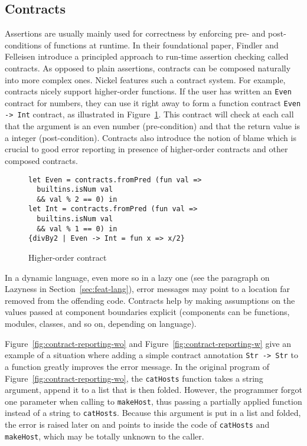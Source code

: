 \documentclass[sigplan,10pt,review,anonymous]{acmart}
\newcommand{\nickel}[1]{\lstinline[language=nickel]{#1}}
\begin{document}
\subsection*{Contracts}

Assertions are usually mainly used for correctness by enforcing pre- and
post-conditions of functions at runtime. In their foundational
paper\cite{FindlerFelleisenHOContracts}, Findler and Felleisen introduce a
principled approach to run-time assertion checking called contracts. As opposed
to plain assertions, contracts can be composed naturally into more complex ones.
Nickel features such a contract system. For example, contracts nicely support
higher-order functions. If the user has written an \nickel{Even} contract for
numbers, they can use it right away to form a function contract \nickel{Even ->
Int} contract, as illustrated in Figure~\ref{fig:contract-higher-order}. This
contract will check at each call that the argument is an even number
(pre-condition) and that the return value is a integer (post-condition).
Contracts also introduce the notion of blame which is crucial to good error
reporting in presence of higher-order contracts and other composed contracts.

\begin{figure}[h]
  \begin{center}
\begin{lstlisting}[language=Nickel]
let Even = contracts.fromPred (fun val =>
  builtins.isNum val
  && val % 2 == 0) in
let Int = contracts.fromPred (fun val =>
  builtins.isNum val
  && val % 1 == 0) in
{divBy2 | Even -> Int = fun x => x/2}
\end{lstlisting}
  \end{center}
\caption{Higher-order contract}
\label{fig:contract-higher-order}
\end{figure}

In a dynamic language, even more so in a lazy one (see the paragraph on Lazyness
in Section~\ref{sec:feat-lang}), error messages may point to a location far
removed from the offending code. Contracts help by making assumptions on the
values passed at component boundaries explicit (components can be functions,
modules, classes, and so on, depending on language).

Figure~\ref{fig:contract-reporting-wo} and Figure~\ref{fig:contract-reporting-w}
give an example of a situation where adding a simple contract annotation
\nickel{Str -> Str} to a function greatly improves the error message. In the
original program of Figure~\ref{fig:contract-reporting-wo}, the
\nickel{catHosts} function takes a string argument, append it to a list that is
then folded. However, the programmer forgot one parameter when calling to
\hbox{\nickel{makeHost},} thus passing a partially applied function instead of a string
to \nickel{catHosts}. Because this argument is put in a list and folded, the
error is raised later on and points to inside the code of \nickel{catHosts} and
\nickel{makeHost}, which may be totally unknown to the caller.
\end{document}
